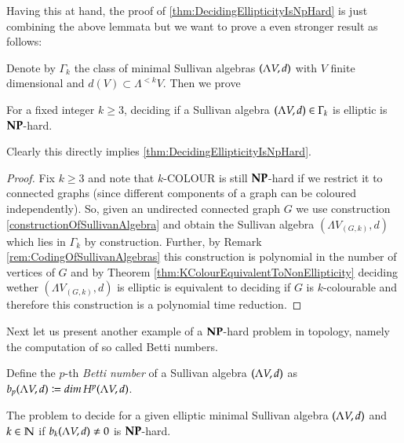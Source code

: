  Having this at hand, the proof of \ref{thm:DecidingEllipticityIsNpHard} is just combining the above lemmata but we 
 want to prove a even stronger result as follows:
 
 Denote by $\Gamma_k$ the class of minimal Sullivan algebras $(\Lambda V,d)$ with $V$ finite dimensional and
 $d(V) \subset \Lambda^{< k} V$. Then we prove
 
 \begin{Theorem}
  For a fixed integer $k \geq 3$, deciding if a Sullivan algebra $(\Lambda V,d) \in \Gamma_k$ is elliptic is $\mathbf{NP}$-hard. 
 \end{Theorem}

 Clearly this directly implies \ref{thm:DecidingEllipticityIsNpHard}.
 \begin{proof}
  Fix $k \geq 3$ and note that $k$-COLOUR is still $\mathbf{NP}$-hard if we restrict it to connected graphs (since different
  components of a graph can be coloured independently). So, given an undirected connected graph $G$ we use
  construction \ref{constructionOfSullivanAlgebra} and obtain the Sullivan algebra $(\Lambda V_{(G,k)},d)$ which lies
  in $\Gamma_k$ by construction. Further, by Remark \ref{rem:CodingOfSullivanAlgebras} this construction is polynomial
  in the number of vertices of $G$ and by Theorem \ref{thm:KColourEquivalentToNonEllipticity} deciding wether
  $(\Lambda V_{(G,k)},d)$ is elliptic is equivalent to deciding if $G$ is $k$-colourable and therefore this construction 
  is a polynomial time reduction.
 \end{proof}

 Next let us present another example of a $\mathbf{NP}$-hard problem in topology, namely the computation
 of so called Betti numbers.
 
 \begin{Definition}
  Define the $p$-th \emph{Betti number} of a Sullivan algebra $(\Lambda V,d)$ as \newline 
  ${b_p (\Lambda V,d) \coloneqq dim \, H^p (\Lambda V,d)}$.
 \end{Definition}


 \begin{Theorem}
  The problem to decide for a given elliptic minimal Sullivan algebra $(\Lambda V,d)$ and $k \in \mathbb{N}$ if
  $b_k (\Lambda V,d) \neq 0$ is $\mathbf{NP}$-hard.
 \end{Theorem}

